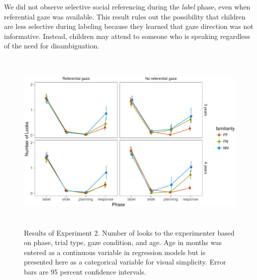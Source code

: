 \documentclass[a4paper,man,apacite,floatsintext]{apa6}
\newenvironment{CodeChunk}{}{}
\begin{document}
We did not observe selective social referencing during the \emph{label}
phase, even when referential gaze was available. This result rules out
the possibility that children are less selective during labeling because
they learned that gaze direction was not informative. Instead, children
may attend to someone who is speaking regardless of the need for
disambiguation.

\begin{CodeChunk}
\begin{figure}[b]

{\centering \includegraphics[width=5.75in,height=3.5in]{figs/results_e2-1} 

}

\caption[Results of Experiment 2]{Results of Experiment 2. Number of looks to the experimenter based on phase, trial type, gaze condition, and age. Age in months was entered as a continuous variable in regression models but is presented here as a categorical variable for visual simplicity. Error bars are 95 percent confidence intervals.}\label{fig:results_e2}
\end{figure}
\end{CodeChunk}
\end{document}
